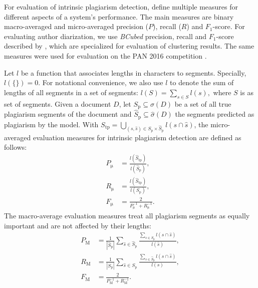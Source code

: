 \documentclass[10pt, a4paper]{article}
\begin{document}
For evaluation of intrinsic plagiarism detection, \citet{stein-2010} define multiple measures for different aspects of a system's performance. The main measures are binary macro-averaged and micro-averaged precision ($P$), recall ($R$) and $F_1$-score. For evaluating author diarization, we use \emph{BCubed} precision, recall and $F_1$-score described by \citet{amigo-2009}, which are specialized for evaluation of clustering results. The same measures were used for evaluation on the PAN 2016 competition \citep{rosso-2016}.

Let $l$ be a function that associates lengths in characters to segments. Specially, $l(\{\}) = 0$. For notational convenience, we also use $l$ to denote the sum of lengths of all segments in a set of segments: $l(S) = \sum_{s\in S} l(s),$ where $S$ is as set of segments. Given a document $D$, let $S_\mathrm{p} \subseteq \sigma(D)$ be a set of all true plagiarism segments of the document and $\hat{S}_\mathrm{p} \subseteq \hat{\sigma}(D)$ the segments predicted as plagiarism by the  model. With ${S_\mathrm{tp} = \bigcup_{(s,\hat{s})\in S_\mathrm{p}\times\hat{S}_\mathrm{p}} l(s\cap\hat{s})}$, the micro-averaged evaluation measures for intrinsic plagiarism detection are defined as follows:
\begin{align}
P_\mathrm{\mu} &= \frac{l(\hat{S}_\mathrm{tp})}{l(\hat{S}_\mathrm{p})}, \\
R_\mathrm{\mu} &= \frac{l(\hat{S}_\mathrm{tp})}{l(S_\mathrm{p})}, \\
F_\mathrm{\mu} &= \frac{2}{P_\mathrm{\mu}^{-1}+R_\mathrm{\mu}^{-1}}.
\end{align}
The macro-average evaluation measures treat all plagiarism segments as equally important and are not affected by their lengths:
\begin{align}
P_\mathrm{M} &= \frac{1}{|\hat{S}_\mathrm{p}|}
	\sum_{\hat{s}\in\hat{S}_\mathrm{p}}
		\frac{{\sum_{s\in S_\mathrm{p}} l(s\cap\hat{s})}}{l(\hat{s})}, \\
R_\mathrm{M} &= \frac{1}{|S_\mathrm{p}|}
	\sum_{\hat{s}\in S_\mathrm{p}}
		\frac{{\sum_{s\in \hat{S}_\mathrm{p}} l(s\cap\hat{s})}}{l(s)}, \\
F_\mathrm{M} &= \frac{2}{P_\mathrm{M}^{-1}+R_\mathrm{M}^{-1}}.
\end{align}
\end{document}
